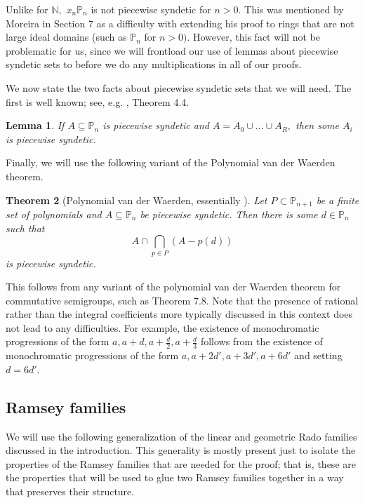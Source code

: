 \documentclass[10pt,a4paper]{article}
\newtheorem{theorem}{Theorem}[section]
\newtheorem{lemma}[theorem]{Lemma}
\theoremstyle{definition}
\begin{document}
Unlike for $\mathbb{N},$ $x_{n}\mathbb{P}_n$ is not piecewise syndetic for $n>0.$  This was mentioned by Moreira in \cite{moreira2017monochromatic} Section 7 as a difficulty with extending his proof to rings that are not large ideal domains (such as $\mathbb{P}_n$ for $n>0)$.  However, this fact will not be problematic for us, since we will frontload our use of lemmas about piecewise syndetic sets to before we do any multiplications in all of our proofs.

We now state the two facts about piecewise syndetic sets that we will need.  The first is well known; see, e.g. \cite{hindman2011algebra}, Theorem 4.4.

\begin{lemma}\label{lemma tech}
If $A\subseteq \mathbb{P}_n$ is piecewise syndetic and $A=A_0\cup...\cup A_R,$ then some $A_i$ is piecewise syndetic.
\end{lemma}

Finally, we will use the following variant of the Polynomial van der Waerden theorem.

\begin{theorem}[Polynomial van der Waerden, essentially \cite{bergelson1996polynomial}]\label{pvd}
Let $P\subset \mathbb{P}_{n+1}$ be a finite set of polynomials and $A\subseteq\mathbb{P}_n$ be piecewise syndetic.  Then there is some $d\in\mathbb{P}_n$ such that $$A\cap \bigcap_{p\in P}(A-p(d))$$ is piecewise syndetic.

\end{theorem}

This follows from any variant of the polynomial van der Waerden theorem for commutative semigroups, such as \cite{bergelson2016interplay} Theorem 7.8.  Note that the presence of rational rather than the integral coefficients more typically discussed in this context does not lead to any difficulties.  For example, the existence of monochromatic progressions of the form $a,a+d, a+\frac{d}{2}, a+\frac{d}{3}$ follows from the existence of monochromatic progressions of the form $a, a+2d', a+3d', a+6d'$ and setting $d=6d'.$


\subsection{Ramsey families}\label{subs family}

We will use the following generalization of the linear and geometric Rado families discussed in the introduction.  This generality is mostly present just to isolate the properties of the Ramsey families that are needed for the proof; that is, these are the properties that will be used to glue two Ramsey families together in a way that preserves their structure.
\end{document}
